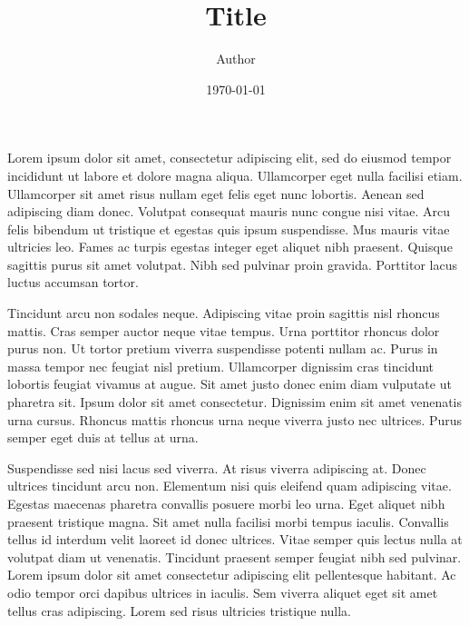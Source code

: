\documentclass[11pt]{article}
\title{ Title}
\author{ Author }
\date{\today}
\begin{document}
\maketitle

Lorem ipsum dolor sit amet, consectetur adipiscing elit, sed do eiusmod tempor incididunt ut labore et dolore magna aliqua. Ullamcorper eget nulla facilisi etiam. Ullamcorper sit amet risus nullam eget felis eget nunc lobortis. Aenean sed adipiscing diam donec. Volutpat consequat mauris nunc congue nisi vitae. Arcu felis bibendum ut tristique et egestas quis ipsum suspendisse. Mus mauris vitae ultricies leo. Fames ac turpis egestas integer eget aliquet nibh praesent. Quisque sagittis purus sit amet volutpat. Nibh sed pulvinar proin gravida. Porttitor lacus luctus accumsan tortor.

Tincidunt arcu non sodales neque. Adipiscing vitae proin sagittis nisl rhoncus mattis. Cras semper auctor neque vitae tempus. Urna porttitor rhoncus dolor purus non. Ut tortor pretium viverra suspendisse potenti nullam ac. Purus in massa tempor nec feugiat nisl pretium. Ullamcorper dignissim cras tincidunt lobortis feugiat vivamus at augue. Sit amet justo donec enim diam vulputate ut pharetra sit. Ipsum dolor sit amet consectetur. Dignissim enim sit amet venenatis urna cursus. Rhoncus mattis rhoncus urna neque viverra justo nec ultrices. Purus semper eget duis at tellus at urna.

Suspendisse sed nisi lacus sed viverra. At risus viverra adipiscing at. Donec ultrices tincidunt arcu non. Elementum nisi quis eleifend quam adipiscing vitae. Egestas maecenas pharetra convallis posuere morbi leo urna. Eget aliquet nibh praesent tristique magna. Sit amet nulla facilisi morbi tempus iaculis. Convallis tellus id interdum velit laoreet id donec ultrices. Vitae semper quis lectus nulla at volutpat diam ut venenatis. Tincidunt praesent semper feugiat nibh sed pulvinar. Lorem ipsum dolor sit amet consectetur adipiscing elit pellentesque habitant. Ac odio tempor orci dapibus ultrices in iaculis. Sem viverra aliquet eget sit amet tellus cras adipiscing. Lorem sed risus ultricies tristique nulla.
\end{document}
